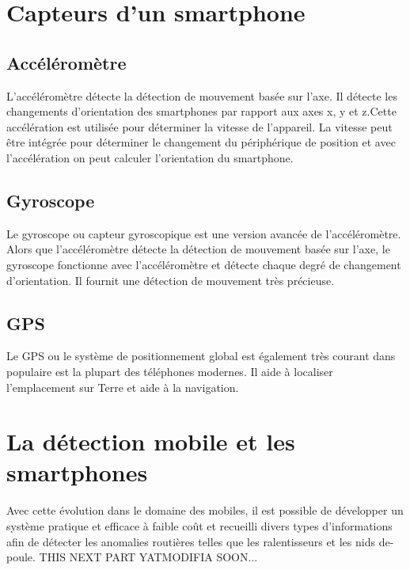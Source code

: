  \section{Capteurs d'un smartphone} 

 \subsection{Accéléromètre}
 L'accéléromètre détecte la détection de mouvement basée sur l'axe. Il détecte les changements d'orientation des smartphones par rapport aux axes x, y et z.Cette accélération est utilisée pour déterminer la vitesse de l’appareil. La vitesse peut être intégrée pour déterminer le changement du périphérique de position et avec l’accélération on peut calculer l’orientation du smartphone.

 \subsection{Gyroscope}
Le gyroscope ou capteur gyroscopique est une version avancée de l'accéléromètre. Alors que l'accéléromètre détecte la détection de mouvement basée sur l'axe, le gyroscope fonctionne avec l'accéléromètre et détecte chaque degré de changement d'orientation. Il fournit une détection de mouvement très précieuse.

\subsection{GPS}
Le GPS ou le système de positionnement global est également très courant dans populaire est la plupart des téléphones modernes. Il aide à localiser l'emplacement sur Terre et aide à la navigation.


\section{La détection mobile et les smartphones}

Avec cette évolution dans le domaine des mobiles, il est possible de développer un système pratique et efficace à faible coût et recueilli divers types d'informations afin de détecter les anomalies routières telles que les ralentisseurs et les nids de-poule.\newline
THIS NEXT PART YATMODIFIA SOON...

